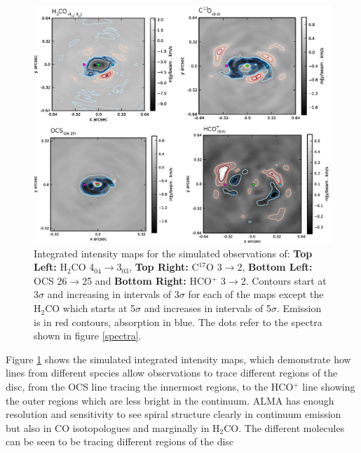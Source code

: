 \documentclass[useAMS,usenatbib]{mn2e}
\begin{document}
\begin{figure}
 \includegraphics[width=140mm]{Figures/sim/casa_all_30deg_contSub_dots.eps}
 \caption{Integrated intensity maps for the simulated observations of: {\bf Top Left:} H$_2$CO 4$_{04}\rightarrow$3$_{03}$, {\bf Top Right:} C$^{17}$O 3$\rightarrow$2, {\bf Bottom Left:} OCS 26$\rightarrow$25 and {\bf Bottom Right:} HCO$^+$ 3$\rightarrow$2. Contours start at 3$\sigma$ and increasing in intervals of 3$\sigma$ for each of the maps except the H$_2$CO which starts at 5$\sigma$ and increases in intervals of 5$\sigma$. Emission is in red contours, absorption in blue. The dots refer to the spectra shown in figure \ref{spectra}.}
\label{mom0_maps}
\end{figure}

Figure \ref{mom0_maps} shows the simulated integrated intensity maps, which demonstrate how lines from different species allow observations to trace different regions of the disc, from the OCS line tracing the innermost regions, to the HCO$^+$ line showing the outer regions which are less bright in the continuum. ALMA has enough resolution and sensitivity to see spiral structure clearly in continuum emission but also in CO isotopologues and marginally in H$_2$CO. The different molecules can be seen to be tracing different regions of the disc\smallskip
\end{document}
